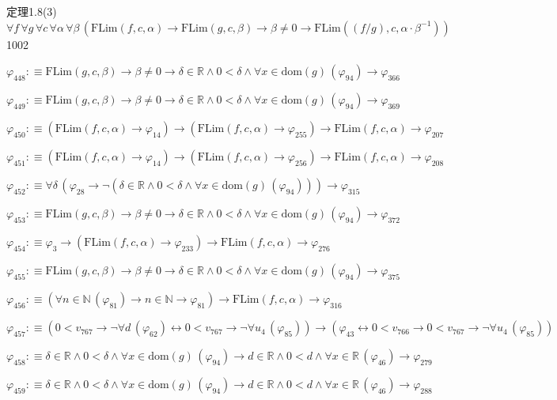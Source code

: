 \begin{fullproof}{定理1.8(3)}{$\forall f\,\forall g\,\forall c\,\forall \alpha\,\forall \beta\,(\mathrm{FLim}(f,c,\alpha) \to \mathrm{FLim}(g,c,\beta) \to \beta \neq 0 \to \mathrm{FLim}((f / g),c,\alpha \cdot \beta^{-1}))$}{1002}
\begin{abbrevlist}
\item $\varphi_{448} :\equiv \mathrm{FLim}(g,c,\beta) \to \beta \neq 0 \to \delta \in \mathbb{R} \land 0 < \delta \land \forall x \in \mathrm{dom}(g)\,(\varphi_{94}) \to \varphi_{366}$
\item $\varphi_{449} :\equiv \mathrm{FLim}(g,c,\beta) \to \beta \neq 0 \to \delta \in \mathbb{R} \land 0 < \delta \land \forall x \in \mathrm{dom}(g)\,(\varphi_{94}) \to \varphi_{369}$
\item $\varphi_{450} :\equiv (\mathrm{FLim}(f,c,\alpha) \to \varphi_{14}) \to (\mathrm{FLim}(f,c,\alpha) \to \varphi_{255}) \to \mathrm{FLim}(f,c,\alpha) \to \varphi_{207}$
\item $\varphi_{451} :\equiv (\mathrm{FLim}(f,c,\alpha) \to \varphi_{14}) \to (\mathrm{FLim}(f,c,\alpha) \to \varphi_{256}) \to \mathrm{FLim}(f,c,\alpha) \to \varphi_{208}$
\item $\varphi_{452} :\equiv \forall \delta\,(\varphi_{28} \to \neg (\delta \in \mathbb{R} \land 0 < \delta \land \forall x \in \mathrm{dom}(g)\,(\varphi_{94}))) \to \varphi_{315}$
\item $\varphi_{453} :\equiv \mathrm{FLim}(g,c,\beta) \to \beta \neq 0 \to \delta \in \mathbb{R} \land 0 < \delta \land \forall x \in \mathrm{dom}(g)\,(\varphi_{94}) \to \varphi_{372}$
\item $\varphi_{454} :\equiv \varphi_{3} \to (\mathrm{FLim}(f,c,\alpha) \to \varphi_{233}) \to \mathrm{FLim}(f,c,\alpha) \to \varphi_{276}$
\item $\varphi_{455} :\equiv \mathrm{FLim}(g,c,\beta) \to \beta \neq 0 \to \delta \in \mathbb{R} \land 0 < \delta \land \forall x \in \mathrm{dom}(g)\,(\varphi_{94}) \to \varphi_{375}$
\item $\varphi_{456} :\equiv (\forall n \in \mathbb{N}\,(\varphi_{81}) \to n \in \mathbb{N} \to \varphi_{81}) \to \mathrm{FLim}(f,c,\alpha) \to \varphi_{316}$
\item $\varphi_{457} :\equiv (0 < v_{767} \to \neg \forall d\,(\varphi_{62}) \leftrightarrow 0 < v_{767} \to \neg \forall u_{4}\,(\varphi_{85})) \to (\varphi_{43} \leftrightarrow 0 < v_{766} \to 0 < v_{767} \to \neg \forall u_{4}\,(\varphi_{85}))$
\item $\varphi_{458} :\equiv \delta \in \mathbb{R} \land 0 < \delta \land \forall x \in \mathrm{dom}(g)\,(\varphi_{94}) \to d \in \mathbb{R} \land 0 < d \land \forall x \in \mathbb{R}\,(\varphi_{46}) \to \varphi_{279}$
\item $\varphi_{459} :\equiv \delta \in \mathbb{R} \land 0 < \delta \land \forall x \in \mathrm{dom}(g)\,(\varphi_{94}) \to d \in \mathbb{R} \land 0 < d \land \forall x \in \mathbb{R}\,(\varphi_{46}) \to \varphi_{288}$

\end{abbrevlist}
\end{fullproof}
